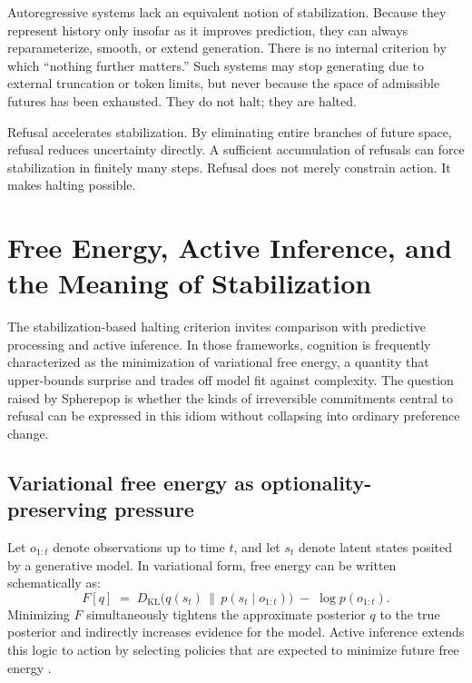 \documentclass[11pt]{article}
\begin{document}
Autoregressive systems lack an equivalent notion of stabilization. Because they
represent history only insofar as it improves prediction, they can always
reparameterize, smooth, or extend generation. There is no internal criterion by
which ``nothing further matters.'' Such systems may stop generating due to
external truncation or token limits, but never because the space of admissible
futures has been exhausted. They do not halt; they are halted.

Refusal accelerates stabilization. By eliminating entire branches of future
space, refusal reduces uncertainty directly. A sufficient accumulation of
refusals can force stabilization in finitely many steps. Refusal does not merely
constrain action. It makes halting possible.

\section{Free Energy, Active Inference, and the Meaning of Stabilization}

The stabilization-based halting criterion invites comparison with predictive
processing and active inference. In those frameworks, cognition is frequently
characterized as the minimization of variational free energy, a quantity that
upper-bounds surprise and trades off model fit against complexity. The question
raised by Spherepop is whether the kinds of irreversible commitments central to
refusal can be expressed in this idiom without collapsing into ordinary
preference change.

\subsection{Variational free energy as optionality-preserving pressure}

Let $o_{1:t}$ denote observations up to time $t$, and let $s_t$ denote latent
states posited by a generative model. In variational form, free energy can be
written schematically as:
\[
F[q] \;=\; D_{\mathrm{KL}}\!\bigl(q(s_t)\,\|\,p(s_t\mid o_{1:t})\bigr)\;-\;\log p(o_{1:t}).
\]
Minimizing $F$ simultaneously tightens the approximate posterior $q$ to the
true posterior and indirectly increases evidence for the model. Active inference
extends this logic to action by selecting policies that are expected to minimize
future free energy \cite{friston2010freeenergy,clark2016surfing}.
\end{document}
